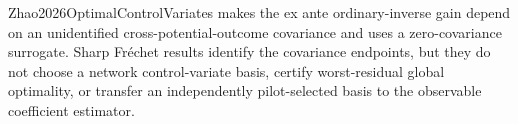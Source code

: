 Zhao2026OptimalControlVariates makes the ex ante ordinary-inverse gain depend on an unidentified cross-potential-outcome covariance and uses a zero-covariance surrogate.  Sharp Fr\'echet results identify the covariance endpoints, but they do not choose a network control-variate basis, certify worst-residual global optimality, or transfer an independently pilot-selected basis to the observable coefficient estimator.